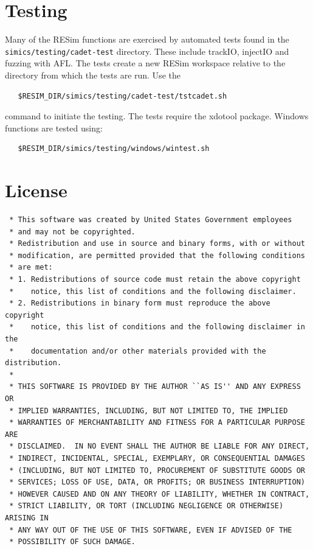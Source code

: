 \documentclass[titlepage]{article}
\begin{document}
\section{Testing}
Many of the RESim functions are exercised by automated tests found in the {\tt simics/testing/cadet-test} directory.
These include trackIO, injectIO and fuzzing with AFL.  The tests create a new RESim workspace relative to
the directory from which the tests are run.  Use the
\begin{verbatim}
   $RESIM_DIR/simics/testing/cadet-test/tstcadet.sh
\end{verbatim}
\noindent command to initiate the testing.  The tests require the xdotool package.
Windows functions are tested using:
\begin{verbatim}
   $RESIM_DIR/simics/testing/windows/wintest.sh
\end{verbatim}

\section{License}

\begin{verbatim}
 * This software was created by United States Government employees
 * and may not be copyrighted.
 * Redistribution and use in source and binary forms, with or without
 * modification, are permitted provided that the following conditions
 * are met:
 * 1. Redistributions of source code must retain the above copyright
 *    notice, this list of conditions and the following disclaimer.
 * 2. Redistributions in binary form must reproduce the above copyright
 *    notice, this list of conditions and the following disclaimer in the
 *    documentation and/or other materials provided with the distribution.
 *
 * THIS SOFTWARE IS PROVIDED BY THE AUTHOR ``AS IS'' AND ANY EXPRESS OR
 * IMPLIED WARRANTIES, INCLUDING, BUT NOT LIMITED TO, THE IMPLIED
 * WARRANTIES OF MERCHANTABILITY AND FITNESS FOR A PARTICULAR PURPOSE ARE
 * DISCLAIMED.  IN NO EVENT SHALL THE AUTHOR BE LIABLE FOR ANY DIRECT,
 * INDIRECT, INCIDENTAL, SPECIAL, EXEMPLARY, OR CONSEQUENTIAL DAMAGES
 * (INCLUDING, BUT NOT LIMITED TO, PROCUREMENT OF SUBSTITUTE GOODS OR
 * SERVICES; LOSS OF USE, DATA, OR PROFITS; OR BUSINESS INTERRUPTION)
 * HOWEVER CAUSED AND ON ANY THEORY OF LIABILITY, WHETHER IN CONTRACT,
 * STRICT LIABILITY, OR TORT (INCLUDING NEGLIGENCE OR OTHERWISE) ARISING IN
 * ANY WAY OUT OF THE USE OF THIS SOFTWARE, EVEN IF ADVISED OF THE
 * POSSIBILITY OF SUCH DAMAGE.
\end{verbatim}
\end{document}
